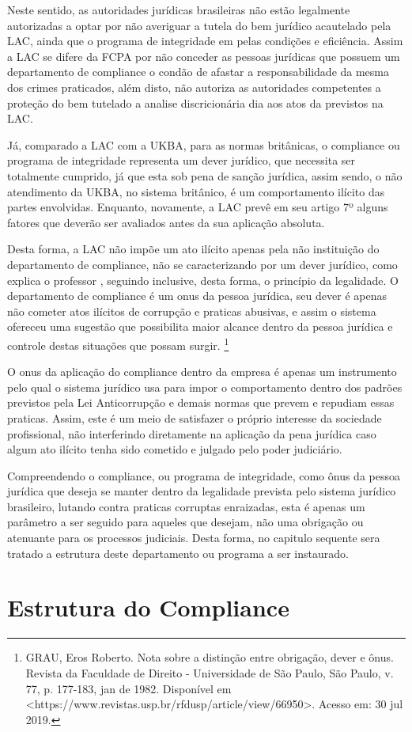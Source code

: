 Neste sentido, as autoridades jurídicas brasileiras não estão legalmente autorizadas a optar por não averiguar a tutela do bem jurídico acautelado pela LAC, ainda que o programa de integridade em pelas condições e eficiência. Assim a LAC se difere da FCPA por não conceder as pessoas jurídicas que possuem um departamento de compliance o condão de afastar a responsabilidade da mesma dos crimes praticados, além disto, não autoriza as autoridades competentes a proteção do bem tutelado a analise discricionária 
dia aos atos da previstos na LAC. 

Já, comparado a LAC com a UKBA, para as normas britânicas, o compliance ou programa de integridade representa um dever jurídico, que necessita ser totalmente cumprido, já que esta sob pena de sanção jurídica, assim sendo, o não atendimento da UKBA, no sistema britânico, é um comportamento ilícito das partes envolvidas. Enquanto, novamente, a LAC prevê em seu artigo 7º alguns fatores que deverão ser avaliados antes da sua aplicação absoluta. 

Desta forma, a LAC não impõe um ato ilícito apenas pela não instituição do departamento de compliance, não se caracterizando por um dever jurídico, como explica o professor \cite{RobertoOnus}, seguindo inclusive, desta forma, o princípio da legalidade. O departamento de compliance é um onus da pessoa jurídica, seu dever é apenas não cometer atos ilícitos de corrupção e praticas abusivas, e assim o sistema ofereceu uma sugestão que possibilita maior alcance dentro da pessoa jurídica e controle destas situações que possam surgir. \footnote{GRAU, Eros Roberto. Nota sobre a distinção entre obrigação, dever e ônus. Revista da Faculdade de Direito - Universidade de São Paulo, São Paulo, v. 77, p. 177-183, jan de 1982. Disponível em <https://www.revistas.usp.br/rfdusp/article/view/66950>. Acesso em: 30 jul 2019.}


O onus da aplicação do compliance dentro da empresa é apenas um instrumento pelo qual o sistema jurídico usa para impor o comportamento dentro dos padrões previstos pela Lei Anticorrupção e demais normas que prevem e repudiam essas praticas. Assim, este é  um meio de satisfazer o próprio interesse da sociedade profissional, não interferindo diretamente na aplicação da pena jurídica caso algum ato ilícito tenha sido cometido e julgado pelo poder judiciário.

Compreendendo o compliance, ou programa de integridade, como ônus da pessoa jurídica que deseja se manter dentro da legalidade prevista pelo sistema jurídico brasileiro, lutando contra praticas corruptas enraizadas, esta é apenas um parâmetro a ser seguido para aqueles que desejam, não uma obrigação ou atenuante para os processos judiciais. Desta forma, no capitulo sequente sera tratado a estrutura deste departamento ou programa a ser instaurado. 


\chapter{Estrutura do Compliance}
